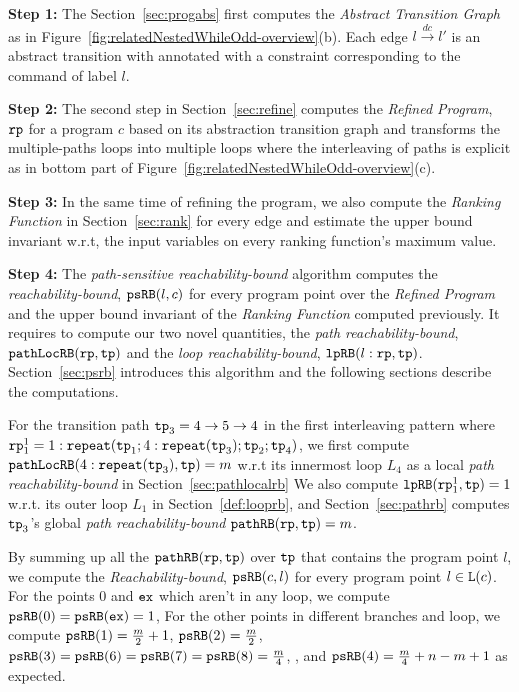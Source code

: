 \textbf{Step 1: }
The Section~\ref{sec:progabs} first 
computes the \emph{Abstract Transition Graph} as in Figure~\ref{fig:relatedNestedWhileOdd-overview}(b).
Each edge $l \xrightarrow{dc} l'$ is an abstract transition with annotated with a constraint corresponding to the command of label $l$.

\textbf{Step 2: }
The second step in Section~\ref{sec:refine}
computes the \emph{Refined Program}, $\mathtt{rp}$ for a program $c$ based on 
its abstraction transition graph and transforms the multiple-paths loops
into multiple loops where
the interleaving of paths is explicit as in bottom part of Figure~\ref{fig:relatedNestedWhileOdd-overview}(c).

\textbf{Step 3: }
In the same time of refining the program, we also compute the \emph{Ranking Function} in Section~\ref{sec:rank}
for every edge 
and estimate the upper bound invariant w.r.t, the input variables on every ranking function's maximum value.

\textbf{Step 4: }
The \emph{path-sensitive reachability-bound} algorithm computes the \emph{reachability-bound}, $\mathtt{psRB}(l, c)$ for every program point over the \emph{Refined Program} and the upper bound invariant of the \emph{Ranking Function} computed previously.
It requires to compute our two novel quantities, the \emph{path reachability-bound}, $\mathtt{pathLocRB}(\mathtt{rp}, \mathtt{tp})$ and the \emph{loop reachability-bound}, $\mathtt{lpRB}(l: \mathtt{rp}, \mathtt{tp})$.
Section~\ref{sec:psrb} introduces this algorithm and the following sections describe the computations. 

For the transition path $\mathtt{tp}_3 = 4 \to 5 \to 4$ in the first interleaving pattern where $\mathtt{rp}_1^1 = 1: \mathtt{repeat}(\mathtt{tp}_1; 4:\mathtt{repeat}(\mathtt{tp}_3); \mathtt{tp}_2; \mathtt{tp}_4)$,
we first compute $\mathtt{pathLocRB}(4:\mathtt{repeat}(\mathtt{tp}_3), \mathtt{tp}) = m$ w.r.t its innermost loop $L_4$ as a local \emph{path reachability-bound} in Section~\ref{sec:pathlocalrb}
We also compute $\mathtt{lpRB}(\mathtt{rp}_1^1, \mathtt{tp}) = 1$ w.r.t. its outer loop $L_1$ in Section~\ref{def:looprb},
and Section~\ref{sec:pathrb} computes $\mathtt{tp}_3$'s global \emph{path reachability-bound} $\mathtt{pathRB}(\mathtt{rp}, \mathtt{tp}) = m$.

By summing up all the $\mathtt{pathRB}(\mathtt{rp}, \mathtt{tp})$ over $\mathtt{tp}$ that contains the program point $l$, we compute the \emph{Reachability-bound}, $\mathtt{psRB}(c, l)$ for every program point $l \in \mathtt{L}(c)$.
For the points $0$ and $\mathtt{ex}$ which aren't in any loop, we compute $\mathtt{psRB}(0) = \mathtt{psRB}(\mathtt{ex}) = 1$,
For the other points in different branches and loop, we compute $\mathtt{psRB}(1) = \frac{m}{2} + 1$,
$\mathtt{psRB}(2) = \frac{m}{2} $, 
$\mathtt{psRB}(3) = \mathtt{psRB}(6) = \mathtt{psRB}(7)  = \mathtt{psRB}(8) = \frac{m}{4} $,
,
and $\mathtt{psRB}(4) =  \frac{m}{4} + n - m + 1$ as expected.


